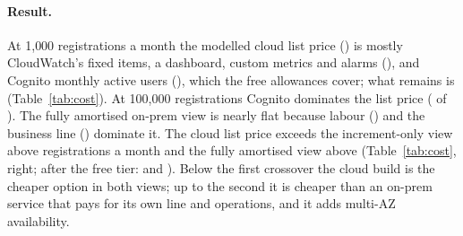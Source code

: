 \paragraph{Result.}
At 1{,}000 registrations a month the modelled cloud list price (\usd\CostTierOneKCloudListUsd) is
mostly CloudWatch's fixed items, a dashboard, custom metrics and alarms
(\usd\CostSvcCloudWatchOneKListUsd), and Cognito monthly active users
(\usd\CostSvcCognitoUserPoolsOneKListUsd), which the free allowances cover; what remains is
\usd\CostTierOneKCloudAfterFreeUsd{} (Table~\ref{tab:cost}). At 100{,}000 registrations Cognito
dominates the list price (\usd\CostSvcCognitoUserPoolsHundredKListUsd{} of
\usd\CostTierHundredKCloudListUsd). The fully amortised on-prem view is nearly flat because labour
(\usd\CostOnpremOneKFullLabourUsd) and the business line (\usd\CostOnpremOneKFullNetworkUsd) dominate
it. The cloud list price exceeds the increment-only view above \CostCrossoverListIncrementRegs{}
registrations a month and the fully amortised view above \CostCrossoverListFullRegs{}
(Table~\ref{tab:cost}, right; after the free tier: \CostCrossoverAfterFreeIncrementRegs{} and
\CostCrossoverAfterFreeFullRegs). Below the first crossover the cloud build is the cheaper option in
both views; up to the second it is cheaper than an on-prem service that pays for its own line and
operations, and it adds multi-AZ availability.

